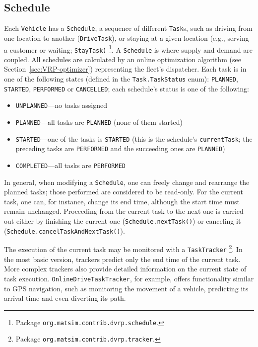 \subsection{Schedule}
\label{sec:VRP-schedule}
Each \lstinline$Vehicle$ has a \lstinline$Schedule$, a sequence of different \lstinline$Task$s, such as driving from one location to another (\lstinline$DriveTask$), or staying at a given location (e.g., serving a customer or waiting;  \lstinline$StayTask)$%
\footnote{
Package \lstinline$org.matsim.contrib.dvrp.schedule$.
}. A \lstinline$Schedule$ is where supply and demand are coupled. All schedules are calculated by an online optimization algorithm (see Section~\ref{sec:VRP-optimizer}) representing the fleet's dispatcher. Each task is in one of the following states (defined in the \lstinline$Task.TaskStatus$ enum): \lstinline$PLANNED$, \lstinline$STARTED$, \lstinline$PERFORMED$ or \lstinline$CANCELLED$; each schedule's status is one of the following:
%
\begin{itemize}
	\item \lstinline$UNPLANNED$---no tasks assigned
	
	\item \lstinline$PLANNED$---all tasks are \lstinline$PLANNED$ (none of them started)
	
	\item \lstinline$STARTED$---one of the tasks is \lstinline$STARTED$ (this is the schedule's \lstinline$currentTask$; the preceding tasks are \lstinline$PERFORMED$ and the succeeding ones are \lstinline$PLANNED$)
	
	\item \lstinline$COMPLETED$---all tasks are \lstinline$PERFORMED$
\end{itemize}
%
In general, when modifying a \lstinline$Schedule$, one can freely change and rearrange the planned tasks; those performed are considered to be read-only. For the current task, one can, for instance, change its end time, although the start time must remain unchanged. Proceeding from the current task to the next one is carried out either by finishing the current one (\lstinline$Schedule.nextTask()$) or canceling it (\lstinline$Schedule.cancelTaskAndNextTask()$).

The execution of the current task may be monitored with a \lstinline$TaskTracker$%
\footnote{
Package \lstinline$org.matsim.contrib.dvrp.tracker$.
}.
In the most basic version, trackers predict only the end time of the current task. More complex trackers also provide detailed information on the current state of task execution. \lstinline$OnlineDriveTaskTracker$, for example, offers functionality similar to GPS navigation, such as monitoring the movement of a vehicle, predicting its arrival time and even diverting its path.

